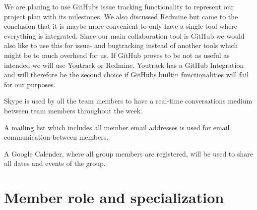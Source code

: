 We are planing to use GitHubs issue tracking functionality to represent our project plan with its milestones.
We also discussed Redmine but came to the conclusion that it is maybe more convenient to only have a single tool where everything is integrated. %
Since our main collaboration tool is GitHub we would also like to use this for issue- and bugtracking instead of another tools which might be to much overhead for us.
If GitHub proves to be not as useful as intended we will use Youtrack or Redmine. Youtrack has a GitHub Integration and will therefore be the second choice if GitHubs builtin functionalities will fail for our purposes. 

Skype is used by all the team members to have a real-time conversations medium between team members throughout the week.

A mailing list which includes all member email addresses is used for email communication between members.

A Google Calender, where all group members are registered, will be used to share all dates and events of the group.

\section{Member role and specialization}

